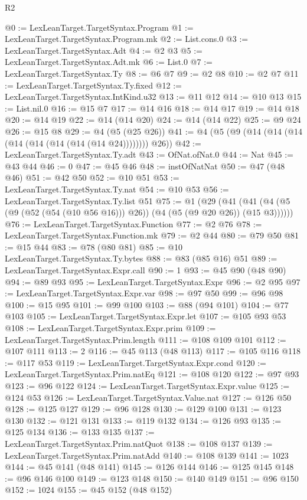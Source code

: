 \begin{lexlean}{R2}
\begin{coremodule}
@0 := LexLeanTarget.TargetSyntax.Program
@1 := LexLeanTarget.TargetSyntax.Program.mk
@2 := List.cons.{0}
@3 := LexLeanTarget.TargetSyntax.Adt
@4 := @2 @3
@5 := LexLeanTarget.TargetSyntax.Adt.mk
@6 := List.{0}
@7 := LexLeanTarget.TargetSyntax.Ty
@8 := @6 @7
@9 := @2 @8
@10 := @2 @7
@11 := LexLeanTarget.TargetSyntax.Ty.fixed
@12 := LexLeanTarget.TargetSyntax.IntKind.u32
@13 := @11 @12
@14 := @10 @13
@15 := List.nil.{0}
@16 := @15 @7
@17 := @14 @16
@18 := @14 @17
@19 := @14 @18
@20 := @14 @19
@22 := @14 (@14 @20)
@24 := @14 (@14 @22)
@25 := @9 @24
@26 := @15 @8
@29 := @4 (@5 (@25 @26))
@41 := @4 (@5 (@9 (@14 (@14 (@14 (@14 (@14 (@14 (@14 (@14 @24)))))))) @26))
@42 := LexLeanTarget.TargetSyntax.Ty.adt
@43 := OfNat.ofNat.{0}
@44 := Nat
@45 := @43 @44
@46 := 0
@47 := @45 @46
@48 := instOfNatNat
@50 := @47 (@48 @46)
@51 := @42 @50
@52 := @10 @51
@53 := LexLeanTarget.TargetSyntax.Ty.nat
@54 := @10 @53
@56 := LexLeanTarget.TargetSyntax.Ty.list @51
@75 := @1
    (@29 (@41 (@41 (@4 (@5 (@9 (@52 (@54 (@10 @56 @16))) @26)) (@4 (@5 (@9 @20 @26)) (@15 @3))))))
@76 := LexLeanTarget.TargetSyntax.Function
@77 := @2 @76
@78 := LexLeanTarget.TargetSyntax.Function.mk
@79 := @2 @44
@80 := @79 @50
@81 := @15 @44
@83 := @78 (@80 @81)
@85 := @10 LexLeanTarget.TargetSyntax.Ty.bytes
@88 := @83 (@85 @16) @51
@89 := LexLeanTarget.TargetSyntax.Expr.call
@90 := 1
@93 := @45 @90 (@48 @90)
@94 := @89 @93
@95 := LexLeanTarget.TargetSyntax.Expr
@96 := @2 @95
@97 := LexLeanTarget.TargetSyntax.Expr.var
@98 := @97 @50
@99 := @96 @98
@100 := @15 @95
@101 := @99 @100
@103 := @88 (@94 @101)
@104 := @77 @103
@105 := LexLeanTarget.TargetSyntax.Expr.let
@107 := @105 @93 @53
@108 := LexLeanTarget.TargetSyntax.Expr.prim
@109 := LexLeanTarget.TargetSyntax.Prim.length
@111 := @108 @109 @101
@112 := @107 @111
@113 := 2
@116 := @45 @113 (@48 @113)
@117 := @105 @116
@118 := @117 @53
@119 := LexLeanTarget.TargetSyntax.Expr.cond
@120 := LexLeanTarget.TargetSyntax.Prim.natEq
@121 := @108 @120
@122 := @97 @93
@123 := @96 @122
@124 := LexLeanTarget.TargetSyntax.Expr.value
@125 := @124 @53
@126 := LexLeanTarget.TargetSyntax.Value.nat
@127 := @126 @50
@128 := @125 @127
@129 := @96 @128
@130 := @129 @100
@131 := @123 @130
@132 := @121 @131
@133 := @119 @132
@134 := @126 @93
@135 := @125 @134
@136 := @133 @135
@137 := LexLeanTarget.TargetSyntax.Prim.natQuot
@138 := @108 @137
@139 := LexLeanTarget.TargetSyntax.Prim.natAdd
@140 := @108 @139
@141 := 1023
@144 := @45 @141 (@48 @141)
@145 := @126 @144
@146 := @125 @145
@148 := @96 @146 @100
@149 := @123 @148
@150 := @140 @149
@151 := @96 @150
@152 := 1024
@155 := @45 @152 (@48 @152)

\end{coremodule}
\end{lexlean}
